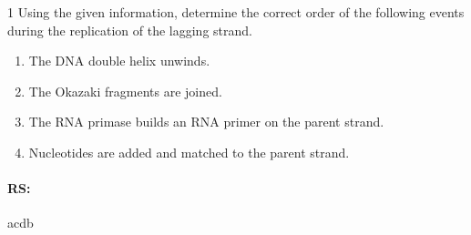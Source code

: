 \documentclass[\mainfilename]{subfiles}
\begin{document}
\begin{questionBox}1{ %
    Using the given information, determine the correct order of the following events during the replication of the lagging strand.
} %
    \begin{enumerate}
        \item The DNA double helix unwinds.
        \item The Okazaki fragments are joined.
        \item The RNA primase builds an RNA primer on the parent strand. 
        \item Nucleotides are added and matched to the parent strand.
    \end{enumerate}
    \paragraph*{RS:} a\to c\to d\to b
\end{questionBox}
\end{document}
